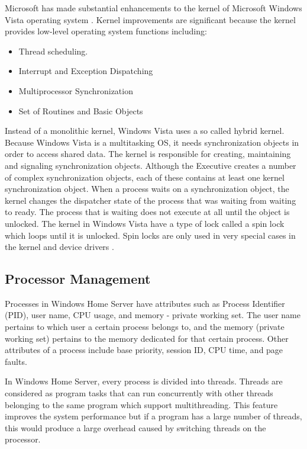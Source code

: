 \documentclass[a4paper, 12pt]{article}
\begin{document}
Microsoft has made substantial enhancements to the kernel of Microsoft Windows Vista operating system \parencite{abdulmalik2010windows}. Kernel improvements are significant because the kernel provides low-level operating system functions including:
\begin{itemize}
    \item Thread scheduling.
    \item Interrupt and Exception Dispatching
    \item Multiprocessor Synchronization
    \item Set of Routines and Basic Objects
\end{itemize}
Instead of a monolithic kernel, Windows Vista uses a so called hybrid kernel. Because Windows Vista is a multitasking OS, it needs synchronization objects in order to access shared data. The kernel is responsible for creating, maintaining and signaling synchronization objects. Although the Executive creates a number of complex synchronization objects, each of these contains at least one kernel synchronization object. When a process waits on a synchronization object, the kernel changes the dispatcher state of the process that was waiting from waiting to ready. The process that is waiting does not execute at all until the object is unlocked. The kernel in Windows Vista have a type of lock called a spin lock which loops until it is unlocked. Spin locks are only used in very special cases in the kernel and device drivers \parencite{bitterling2010operating}.

\subsection{Processor Management}

Processes in Windows Home Server have attributes such as Process Identifier (PID), user name, CPU usage, and memory - private working set. The user name pertains to which user a certain process belongs to, and the memory (private working set) pertains to the memory dedicated for that certain process. Other attributes of a process include base priority, session ID, CPU time, and page faults. 

In Windows Home Server, every process is divided into threads. Threads are considered as program tasks that can run concurrently with other threads belonging to the same program which support multithreading. This feature improves the system performance  but if a program has a large number of threads, this would produce a large overhead caused by switching threads on the processor. 
\end{document}
